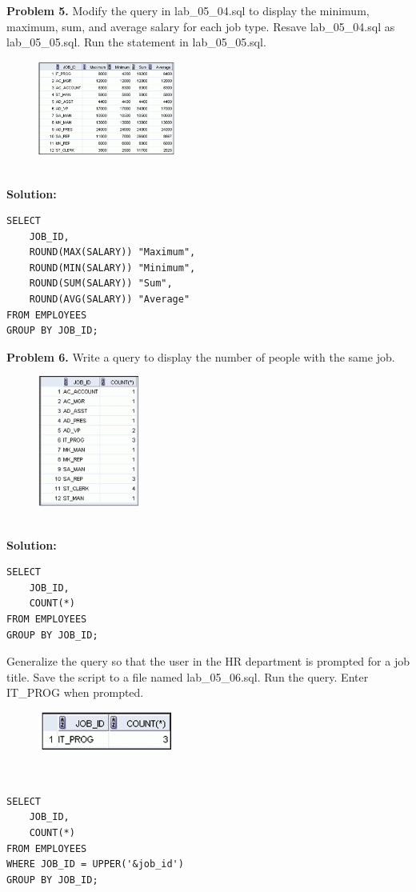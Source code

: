 \documentclass[12pt,a4paper]{article}
\begin{document}
\textbf{Problem 5.} Modify the query in lab\_05\_04.sql to display the minimum, maximum, sum, and average salary for each job type. Resave lab\_05\_04.sql as lab\_05\_05.sql. Run the statement in lab\_05\_05.sql.
\begin{figure}[htbp]
  \centering
  \includegraphics[width=0.4\textwidth]{Screenshots/55.png}
\end{figure}\\ \newpage
\textbf{Solution:}
\begin{lstlisting}[style=sqlstyle]
SELECT 
    JOB_ID,
    ROUND(MAX(SALARY)) "Maximum",
    ROUND(MIN(SALARY)) "Minimum",
    ROUND(SUM(SALARY)) "Sum",
    ROUND(AVG(SALARY)) "Average"
FROM EMPLOYEES
GROUP BY JOB_ID;
\end{lstlisting}

\vspace{0.5cm}

\textbf{Problem 6.} Write a query to display the number of people with the same job.
\begin{figure}[htbp]
  \centering
  \includegraphics[width=0.3\textwidth]{Screenshots/56.png}
\end{figure}\\
\textbf{Solution:}
\begin{lstlisting}[style=sqlstyle]
SELECT 
    JOB_ID,
    COUNT(*)
FROM EMPLOYEES
GROUP BY JOB_ID;
\end{lstlisting}

Generalize the query so that the user in the HR department is prompted for a job title. Save the script to a file named lab\_05\_06.sql. Run the query. Enter IT\_PROG when prompted.
\begin{figure}[htbp]
  \centering
  \includegraphics[width=0.4\textwidth]{Screenshots/562.png}
\end{figure}\\
\begin{lstlisting}[style=sqlstyle]
SELECT 
    JOB_ID,
    COUNT(*)
FROM EMPLOYEES
WHERE JOB_ID = UPPER('&job_id')
GROUP BY JOB_ID;
\end{lstlisting}
\end{document}
